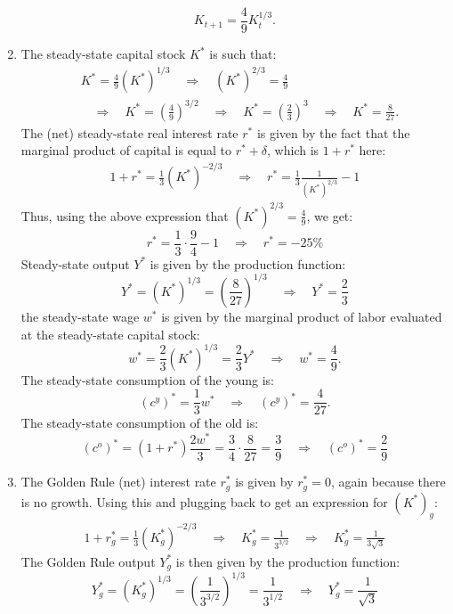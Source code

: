 \documentclass[]{book}
\theoremstyle{definition}
\theoremstyle{definition}
\theoremstyle{definition}
\theoremstyle{remark}
\begin{document}
\begin{enumerate}
  \[K_{t+1} = \frac{4}{9}K_{t}^{1/3}.\]
\item
  The steady-state capital stock \(K^{*}\) is such that: \[
  \begin{aligned}
  & K^{*} = \frac{4}{9}(K^{*})^{1/3} \quad \Rightarrow \quad (K^{*})^{2/3} = \frac{4}{9}\\
  & \quad \Rightarrow \quad K^{*} = \left(\frac{4}{9}\right)^{3/2} \quad \Rightarrow \quad K^{*} = \left(\frac{2}{3}\right)^{3} \quad \Rightarrow \quad \boxed{K^{*} = \frac{8}{27}}.
  \end{aligned}
  \] The (net) steady-state real interest rate \(r^{*}\) is given by the
  fact that the marginal product of capital is equal to
  \(r^{*} + \delta\), which is \(1+r^{*}\) here: \[
  \begin{aligned}
  1+r^{*} = \frac{1}{3}(K^{*})^{-2/3} \quad \Rightarrow \quad r^{*}=\frac{1}{3}\frac{1}{(K^{*})^{2/3}}-1
  \end{aligned}
  \] Thus, using the above expression that
  \((K^{*})^{2/3} = \frac{4}{9}\), we get:
  \[r^{*}=\frac{1}{3} \cdot \frac{9}{4}-1 \quad \Rightarrow \quad  \boxed{r^{*}= -25\%}\]
  Steady-state output \(Y^{*}\) is given by the production function:
  \[Y^{*} = (K^{*})^{1/3} = \left(\frac{8}{27}\right)^{1/3} \quad \Rightarrow \quad \boxed{Y^{*} =\frac{2}{3}}\]
  the steady-state wage \(w^{*}\) is given by the marginal product of
  labor evaluated at the steady-state capital stock:
  \[w^{*}=\frac{2}{3}(K^{*})^{1/3}=\frac{2}{3}Y^{*} \quad \Rightarrow \quad \boxed{w^{*} = \frac{4}{9}}.\]
  The steady-state consumption of the young is:
  \[(c^y)^{*} = \frac{1}{3}w^{*} \quad \Rightarrow \quad \boxed{(c^y)^{*} = \frac{4}{27}}.\]
  The steady-state consumption of the old is:
  \[(c^o)^{*} = (1+r^{*})\frac{2w^{*}}{3} = \frac{3}{4} \cdot \frac{8}{27} = \frac{3}{9} \quad \Rightarrow \quad \boxed{(c^o)^{*} = \frac{2}{9}}\]
\item
  The Golden Rule (net) interest rate \(r^{*}_g\) is given by
  \(r^{*}_g=0\), again because there is no growth. Using this and
  plugging back to get an expression for \((K^{*})_g\): \[
  \begin{aligned}
  1+r^{*}_g = \frac{1}{3}(K^{*}_g)^{-2/3} \quad \Rightarrow \quad K_g^{*}=\frac{1}{3^{3/2}} \quad \Rightarrow \quad \boxed{K_g^{*}=\frac{1}{3\sqrt{3}}}
  \end{aligned}
  \] The Golden Rule output \(Y^{*}_g\) is then given by the production
  function:
  \[Y^{*}_g=(K^{*}_g)^{1/3} = \left(\frac{1}{3^{3/2}}\right)^{1/3} = \frac{1}{3^{1/2}} \quad \Rightarrow \quad \boxed{Y^{*}_g = \frac{1}{\sqrt{3}}}\]

\end{enumerate}
\end{document}
